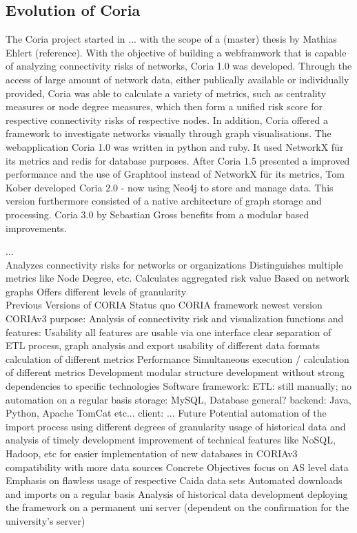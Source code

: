 \documentclass[conference]{IEEEtran}
\begin{document}
\subsection{Evolution of Coria}
The Coria project started in ... with the scope of a (master) thesis by Mathias Ehlert (reference). With the objective of building a webframwork that is capable of analyzing connectivity risks of networks, Coria 1.0 was developed. Through the access of large amount of network data, either publically available or individually provided, Coria was able to calculate a variety of metrics, such as  
centrality measures or node degree measures, which then form a unified risk score for respective connectivity risks of respective nodes. In addition, Coria offered a framework to investigate networks visually through graph visualisations. 
 The webapplication Coria 1.0 was written in python and ruby. It used NetworkX für its metrics and redis for database purposes. After Coria 1.5 presented a improved performance and the use of Graphtool instead of NetworkX für its metrics, Tom Kober developed Coria 2.0 - now using Neo4j to store and manage data. This version furthermore consisted of a native architecture of graph storage and processing. Coria 3.0 by Sebastian Gross benefits from a modular based improvements. 
   
... \\ 
Analyzes connectivity risks for networks or organizations 
Distinguishes multiple metrics like Node Degree, etc.
Calculates aggregated risk value
Based on network graphs
Offers different levels of granularity\\

Previous Versions of CORIA
Status quo CORIA framework	
newest version CORIAv3
purpose: Analysis of connectivity risk and visualization 
functions and features:
Usability
all features are usable via one interface 
clear separation of ETL process, graph analysis and export
usability of different data formats
calculation of different metrics 
Performance	
Simultaneous execution / calculation of different metrics
Development
modular structure
development without strong dependencies to specific technologies
Software framework:
ETL: still manually; no automation on a regular basis
storage: MySQL, Database general? 
backend: Java, Python,  Apache TomCat etc...
client: ...
Future Potential
automation of the import process
using different degrees of granularity
usage of historical data and analysis of timely development 
improvement of technical features like NoSQL, Hadoop, etc for easier implementation of new databases in CORIAv3
compatibility with more data sources
Concrete Objectives
focus on AS level data
Emphasis on flawless usage of respective Caida data sets
Automated downloads and imports on a regular basis
Analysis of historical data development
deploying the framework on a permanent uni server (dependent on the confirmation for the university’s server) 
\end{document}
